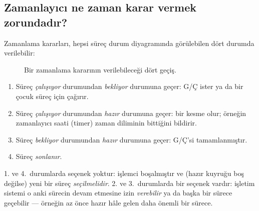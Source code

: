 \subsection{Zamanlayıcı ne zaman karar vermek zorundadır?}

Zamanlama kararları, hepsi süreç durum diyagramında görülebilen dört durumda verilebilir:

\begin{figure}[H]
\centering
{}
\caption{Bir zamanlama kararının verilebileceği dört geçiş.}
\end{figure}

\begin{enumerate}[leftmargin=1.4em]
  \item Süreç \emph{çalışıyor} durumundan \emph{bekliyor} durumuna geçer: G/Ç ister ya da bir çocuk süreç için  çağırır.
  \item Süreç \emph{çalışıyor} durumundan \emph{hazır} durumuna geçer: bir kesme olur; örneğin zamanlayıcı saati (timer) zaman diliminin bittiğini bildirir.
  \item Süreç \emph{bekliyor} durumundan \emph{hazır} durumuna geçer: G/Ç'si tamamlanmıştır.
  \item Süreç \emph{sonlanır}.
\end{enumerate}

1. ve 4.~durumlarda seçenek yoktur: işlemci boşalmıştır ve (hazır kuyruğu boş değilse) yeni bir süreç \emph{seçilmelidir}. 2. ve 3.~durumlarda bir seçenek vardır: işletim sistemi o anki sürecin devam etmesine izin \emph{verebilir} ya da başka bir sürece geçebilir --- örneğin az önce hazır hâle gelen daha önemli bir sürece.

